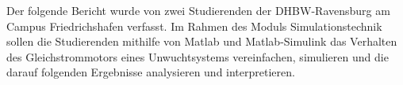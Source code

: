 \label{kurzfassung}

Der folgende Bericht wurde von zwei Studierenden der \ac{DHBW}-Ravensburg am Campus Friedrichshafen verfasst. Im Rahmen des Moduls Simulationstechnik sollen die Studierenden mithilfe von Matlab und Matlab-Simulink das Verhalten des Gleichstrommotors eines Unwuchtsystems vereinfachen, simulieren und die darauf folgenden Ergebnisse analysieren und interpretieren.
